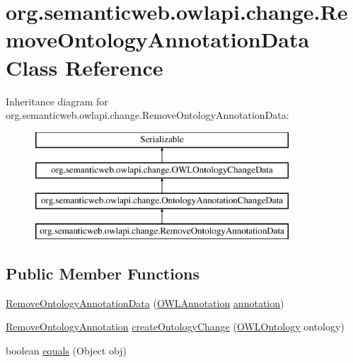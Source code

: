 \hypertarget{classorg_1_1semanticweb_1_1owlapi_1_1change_1_1_remove_ontology_annotation_data}{\section{org.\-semanticweb.\-owlapi.\-change.\-Remove\-Ontology\-Annotation\-Data Class Reference}
\label{classorg_1_1semanticweb_1_1owlapi_1_1change_1_1_remove_ontology_annotation_data}
}
Inheritance diagram for org.\-semanticweb.\-owlapi.\-change.\-Remove\-Ontology\-Annotation\-Data\-:\begin{figure}[H]
\begin{center}
\leavevmode
\includegraphics[height=4.000000cm]{classorg_1_1semanticweb_1_1owlapi_1_1change_1_1_remove_ontology_annotation_data}
\end{center}
\end{figure}
\subsection*{Public Member Functions}
\begin{DoxyCompactItemize}
\item 
\hyperlink{classorg_1_1semanticweb_1_1owlapi_1_1change_1_1_remove_ontology_annotation_data_a6f100bd00b55df917409b8bb2e3ece20}{Remove\-Ontology\-Annotation\-Data} (\hyperlink{interfaceorg_1_1semanticweb_1_1owlapi_1_1model_1_1_o_w_l_annotation}{O\-W\-L\-Annotation} \hyperlink{classorg_1_1semanticweb_1_1owlapi_1_1change_1_1_ontology_annotation_change_data_a9adc959d9ad5bcdce1eee5141c22e3af}{annotation})
\item 
\hyperlink{classorg_1_1semanticweb_1_1owlapi_1_1model_1_1_remove_ontology_annotation}{Remove\-Ontology\-Annotation} \hyperlink{classorg_1_1semanticweb_1_1owlapi_1_1change_1_1_remove_ontology_annotation_data_a11fa319404040e3c0e42c00467bff09b}{create\-Ontology\-Change} (\hyperlink{interfaceorg_1_1semanticweb_1_1owlapi_1_1model_1_1_o_w_l_ontology}{O\-W\-L\-Ontology} ontology)
\item 
boolean \hyperlink{classorg_1_1semanticweb_1_1owlapi_1_1change_1_1_remove_ontology_annotation_data_ac4eb04e8fee46b2f0eb3e23b883c9c06}{equals} (Object obj)
\end{DoxyCompactItemize}
